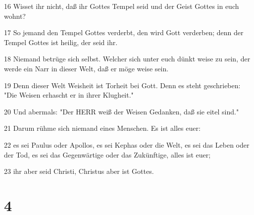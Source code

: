 \par 16 Wisset ihr nicht, daß ihr Gottes Tempel seid und der Geist Gottes in euch wohnt?
\par 17 So jemand den Tempel Gottes verderbt, den wird Gott verderben; denn der Tempel Gottes ist heilig, der seid ihr.
\par 18 Niemand betrüge sich selbst. Welcher sich unter euch dünkt weise zu sein, der werde ein Narr in dieser Welt, daß er möge weise sein.
\par 19 Denn dieser Welt Weisheit ist Torheit bei Gott. Denn es steht geschrieben: "Die Weisen erhascht er in ihrer Klugheit."
\par 20 Und abermals: "Der HERR weiß der Weisen Gedanken, daß sie eitel sind."
\par 21 Darum rühme sich niemand eines Menschen. Es ist alles euer:
\par 22 es sei Paulus oder Apollos, es sei Kephas oder die Welt, es sei das Leben oder der Tod, es sei das Gegenwärtige oder das Zukünftige, alles ist euer;
\par 23 ihr aber seid Christi, Christus aber ist Gottes.

\chapter{4}

